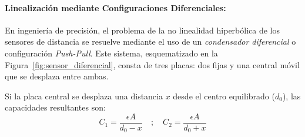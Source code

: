 \begin{marginfigure}
    \centering
    \shorthandoff{>}
    \caption[Comparativa de respuesta variación Área y Distancia.]{Comparativa de respuesta. El sensor de distancia es ideal para desplazamientos ínfimos (nanómetros), mientras que el de área es preferible para rangos mayores.}\label{fig:curvas_sensibilidad}
\end{marginfigure}

\paragraph{Linealización mediante Configuraciones Diferenciales:}

En ingeniería de precisión, el problema de la no linealidad hiperbólica de los sensores de distancia se resuelve mediante el uso de un \emph{condensador diferencial} o configuración \textit{Push-Pull}. Este sistema, esquematizado en la Figura~\ref{fig:sensor_diferencial}, consta de tres placas: dos fijas y una central móvil que se desplaza entre ambas.

Si la placa central se desplaza una distancia $x$ desde el centro equilibrado ($d_0$), las capacidades resultantes son:
\begin{equation}
    C_1 = \frac{\epsilon A}{d_0 - x} \quad ; \quad C_2 = \frac{\epsilon A}{d_0 + x}
\end{equation}

